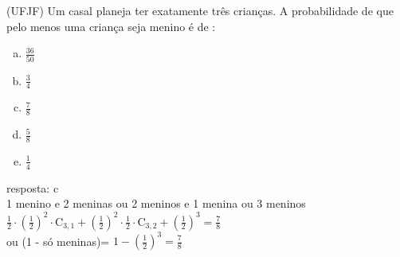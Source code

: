 \begin{ex}
 (UFJF) Um casal planeja ter exatamente três crianças. A probabilidade de que pelo menos uma criança seja menino é de :
    \begin{enumerate}[(a)]
    \item $\frac{36}{50}$
    \item $\frac{3}{4}$
    \item $\frac{7}{8}$
    \item $\frac{5}{8}$
    \item $\frac{1}{4}$
    \end{enumerate}
      \begin{sol}
        resposta: c \\
        1 menino e 2 meninas ou 2 meninos e 1 menina ou 3 meninos \\
        $\frac{1}{2}\cdot(\frac{1}{2})^2\cdot\mathrm{C}_{3,1}+(\frac{1}{2})^2\cdot\frac{1}{2}\cdot\mathrm{C}_{3,2}+(\frac{1}{2})^3=\frac{7}{8}$   \\
        ou (1 - só meninas)= $1-(\frac{1}{2})^3=\frac{7}{8}$
        
      \end{sol}
\end{ex}